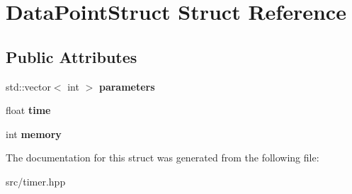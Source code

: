 \hypertarget{structDataPointStruct}{\section{Data\-Point\-Struct Struct Reference}
\label{structDataPointStruct}
}
\subsection*{Public Attributes}
\begin{DoxyCompactItemize}
\item 
\hypertarget{structDataPointStruct_ab19cdad849d37de06c02cacc5ec50cce}{std\-::vector$<$ int $>$ {\bfseries parameters}}\label{structDataPointStruct_ab19cdad849d37de06c02cacc5ec50cce}

\item 
\hypertarget{structDataPointStruct_ae1dae54ff363ef8a6d946907b1621506}{float {\bfseries time}}\label{structDataPointStruct_ae1dae54ff363ef8a6d946907b1621506}

\item 
\hypertarget{structDataPointStruct_a6d345b8aa7e79cd06402446d73d19520}{int {\bfseries memory}}\label{structDataPointStruct_a6d345b8aa7e79cd06402446d73d19520}

\end{DoxyCompactItemize}


The documentation for this struct was generated from the following file\-:\begin{DoxyCompactItemize}
\item 
src/timer.\-hpp\end{DoxyCompactItemize}

